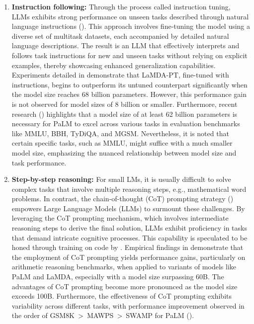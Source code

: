 \begin{enumerate}
{\begin{enumerate}
{\begin{quote}
					            \textbf{Arithmetic Tasks:} \\
					            \textit{Input:} {\enquote{What is the sum of 42 and 63?}} \\
					            \textit{Output:} {\enquote{The sum of 42 and 63 is 105.}}
				            \end{quote}
			            }
			      \item \textbf{Instruction following:}{
				            Through the process called instruction tuning, LLMs exhibits strong performance on unseen tasks described through natural language instructions (\textcite{sanhetal2022multitask, ouyang2022training, wei2022fine}).
				            This approach involves fine-tuning the model using a diverse set of multitask datasets, each accompanied by detailed natural language descriptions. The result is an LLM that effectively interprets and follows task instructions for new and unseen tasks without relying on explicit examples, thereby showcasing enhanced generalization capabilities.
				            Experiments detailed in \textcite{wei2022fine} demonstrate that LaMDA-PT, fine-tuned with instructions, begins to outperform its untuned counterpart significantly when the model size reaches 68 billion parameters. However, this performance gain is not observed for model sizes of 8 billion or smaller. Furthermore, recent research (\textcite{chung2022scaling}) highlights that a model size of at least 62 billion parameters is necessary for PaLM to excel across various tasks in evaluation benchmarks like MMLU, BBH, TyDiQA, and MGSM. Nevertheless, it is noted that certain specific tasks, such as MMLU, might suffice with a much smaller model size, emphasizing the nuanced relationship between model size and task performance.
			            }
			      \item \textbf{Step-by-step reasoning:} { For small LMs, it is usually difficult to solve complex tasks that involve multiple reasoning steps, e.g., mathematical word problems.
				            In contrast, the chain-of-thought (CoT) prompting strategy (\textcite{wei2022chain}) empowers Large Language Models (LLMs) to surmount these challenges. By leveraging the CoT prompting mechanism, which involves intermediate reasoning steps to derive the final solution, LLMs exhibit proficiency in tasks that demand intricate cognitive processes. This capability is speculated to be honed through training on code by \textcite{wei2022chain}. Empirical findings in \textcite{wei2022chain} demonstrate that the employment of CoT prompting yields performance gains, particularly on arithmetic reasoning benchmarks, when applied to variants of models like PaLM and LaMDA, especially with a model size surpassing 60B. The advantages of CoT prompting become more pronounced as the model size exceeds 100B. Furthermore, the effectiveness of CoT prompting exhibits variability across different tasks, with performance improvement observed in the order of GSM8K~\textgreater~MAWPS~\textgreater~SWAMP for PaLM (\textcite{wei2022chain}).
			            }
		      \end{enumerate}
	      }
\end{enumerate}
